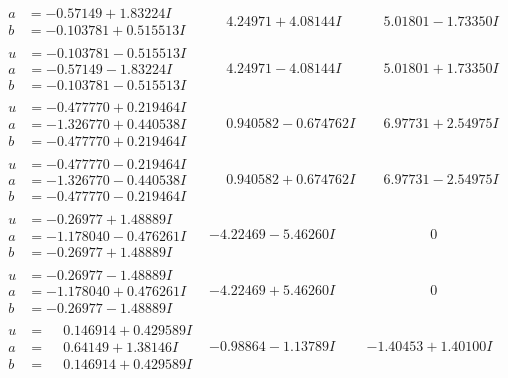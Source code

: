 \documentclass[1p]{elsarticle_modified}
\theoremstyle{definition}
\begin{document}
$$\begin{array}{c|c|c}
\begin{aligned}
a &= -0.57149 + 1.83224 I \\
b &= -0.103781 + 0.515513 I\end{aligned}
 & \phantom{-}4.24971 + 4.08144 I & \phantom{-}5.01801 - 1.73350 I \\ \hline\begin{aligned}
u &= -0.103781 - 0.515513 I \\
a &= -0.57149 - 1.83224 I \\
b &= -0.103781 - 0.515513 I\end{aligned}
 & \phantom{-}4.24971 - 4.08144 I & \phantom{-}5.01801 + 1.73350 I \\ \hline\begin{aligned}
u &= -0.477770 + 0.219464 I \\
a &= -1.326770 + 0.440538 I \\
b &= -0.477770 + 0.219464 I\end{aligned}
 & \phantom{-}0.940582 - 0.674762 I & \phantom{-}6.97731 + 2.54975 I \\ \hline\begin{aligned}
u &= -0.477770 - 0.219464 I \\
a &= -1.326770 - 0.440538 I \\
b &= -0.477770 - 0.219464 I\end{aligned}
 & \phantom{-}0.940582 + 0.674762 I & \phantom{-}6.97731 - 2.54975 I \\ \hline\begin{aligned}
u &= -0.26977 + 1.48889 I \\
a &= -1.178040 - 0.476261 I \\
b &= -0.26977 + 1.48889 I\end{aligned}
 & -4.22469 - 5.46260 I & \phantom{-0.000000 } 0 \\ \hline\begin{aligned}
u &= -0.26977 - 1.48889 I \\
a &= -1.178040 + 0.476261 I \\
b &= -0.26977 - 1.48889 I\end{aligned}
 & -4.22469 + 5.46260 I & \phantom{-0.000000 } 0 \\ \hline\begin{aligned}
u &= \phantom{-}0.146914 + 0.429589 I \\
a &= \phantom{-}0.64149 + 1.38146 I \\
b &= \phantom{-}0.146914 + 0.429589 I\end{aligned}
 & -0.98864 - 1.13789 I & -1.40453 + 1.40100 I \\ \hline\begin{aligned}

\end{aligned}
\end{array}$$
\end{document}
